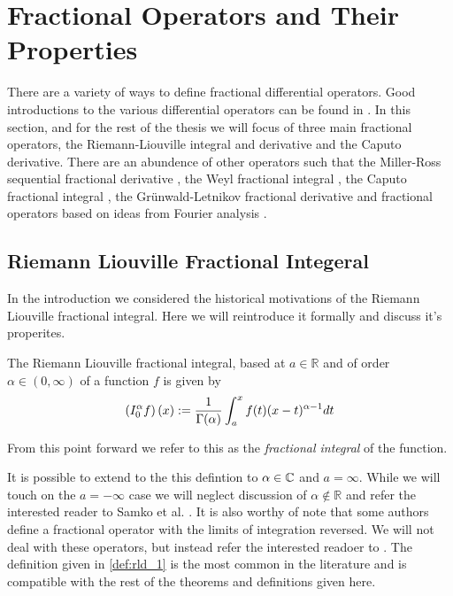 \section{Fractional Operators and Their Properties}
\label{sec:operators}
There are a variety of ways to define fractional differential operators. Good introductions to the various differential operators can be found in \cite{Gorenflo1997, Podlubny1999, Diethelm2002, Samko1993}. In this section, and for the rest of the thesis we will focus of three main fractional operators, the Riemann-Liouville integral and derivative and the Caputo derivative. There are an abundence of other operators such that the Miller-Ross sequential fractional derivative \cite{Miller1993, Podlubny1999}, the Weyl fractional integral \cite{Gorenflo1997, Samko1993, Raina1979}, the Caputo fractional integral \cite{Gorenflo1997}, the Gr{\"u}nwald-Letnikov fractional derivative \cite{Podlubny1999, Samko1993} and fractional operators based on ideas from Fourier analysis \cite{Narayanan2003, Samko1993}.


\subsection{Riemann Liouville Fractional Integeral}
In the introduction we considered the historical motivations of the Riemann Liouville fractional integral. Here we will reintroduce it formally and discuss it's properites.

\begin{definition}
\label{def:rld_1}
The Riemann Liouville fractional integral, based at $ a \in \mathbb{R} $ and of order $ \alpha \in (0, \infty) $ of a function $ f $ is given by
\begin{align}
    \label{eq:rld_1}
    \left( I_{0}^{\alpha} f \right)(x) := \frac{1}{\Gamma(\alpha)} \int_a^x f(t)(x-t)^{\alpha - 1} dt
\end{align}
\end{definition}
From this point forward we refer to this as the \emph{fractional integral} of the function.

It is possible to extend to the this defintion to $ \alpha \in \mathbb{C} $ and $ a = \infty $. While we will touch on the $ a = -\infty $ case we will neglect discussion of $ \alpha \not\in \mathbb{R} $ and refer the interested reader to Samko et al. \cite{Samko1993}.  It is also worthy of note that some authors define a fractional operator with the limits of integration reversed. We will not deal with these operators, but instead refer the interested readoer to \cite{Samko1993, Podlubny1999}. The definition given in \ref{def:rld_1} is the most common in the literature and is compatible with the rest of the theorems and definitions given here.

